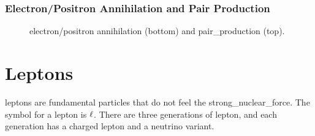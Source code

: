         \subsubsection{Electron/Positron Annihilation and Pair Production}
            \begin{figure} \label{fig:annihilation_and_pair_production}
                \begin{center}
                \end{center}
                \caption{\Gls{electron}/\gls{positron} annihilation (bottom) and \gls{pair_production} (top).}
            \end{figure}
    
    \newpage

    \section{Leptons}
        \Glspl{lepton} are fundamental particles that do not feel the \gls{strong_nuclear_force}.
        The symbol for a \gls{lepton} is $\mathrm{\ell}$.
        There are three generations of \gls{lepton}, and each generation has a charged \gls{lepton} and a \gls{neutrino} variant.

